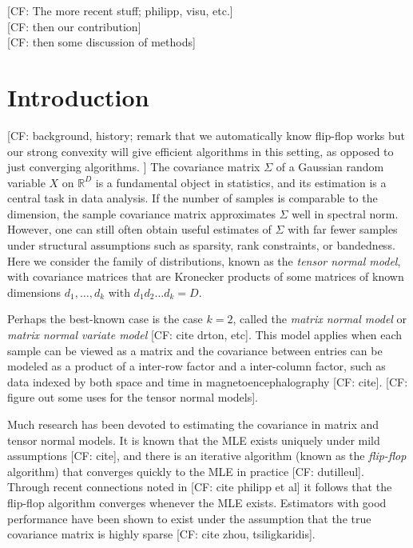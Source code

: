\documentclass{article}
\newcommand{\R}{{\mathbb{R}}}
\newcommand\rv{X}
\newcommand{\CF}[1]{{\color{purple}[CF: #1]}}
\begin{document}
\CF{The more recent stuff; philipp, visu, etc.}\\
\CF{then our contribution}\\
\CF{then some discussion of methods}







\section{Introduction}
\CF{background, history; remark that we automatically know flip-flop works but our strong convexity will give efficient algorithms in this setting, as opposed to just converging algorithms. }
The covariance matrix $\Sigma$ of a Gaussian random variable $\rv$ on $\R^D$ is a fundamental object in statistics, and its estimation is a central task in data analysis. If the number of samples is comparable to the dimension, the sample covariance matrix approximates $\Sigma$ well in spectral norm. However, one can still often obtain useful estimates of $\Sigma$ with far fewer samples under structural assumptions such as sparsity, rank constraints, or bandedness. Here we consider the family of distributions, known as the \emph{tensor normal model}, with covariance matrices that are Kronecker products of some matrices of known dimensions $d_1, \dots, d_k$ with $d_1d_2\dots d_k = D$.

Perhaps the best-known case is the case $k = 2$, called the \emph{matrix normal model} or  \emph{matrix normal variate model} \CF{cite drton, etc}. This model applies when each sample can be viewed as a matrix and the covariance between entries can be modeled as a product of a inter-row factor and a inter-column factor, such as data indexed by both space and time in magnetoencephalography \CF{cite}. \CF{figure out some uses for the tensor normal models}.

Much research has been devoted to estimating the covariance in matrix and tensor normal models. It is known that the MLE exists uniquely under mild assumptions \CF{cite}, and there is an iterative algorithm (known as the \emph{flip-flop} algorithm) that converges quickly to the MLE in practice \CF{dutilleul}. Through recent connections noted in \CF{cite philipp et al} it follows that the flip-flop algorithm converges whenever the MLE exists. Estimators with good performance have been shown to exist under the assumption that the true covariance matrix is highly sparse \CF{cite zhou, tsiligkaridis}.
\end{document}
